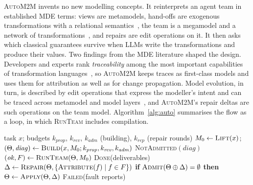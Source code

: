 \documentclass[pdflatex,sn-mathphys-num]{sn-jnl}
\theoremstyle{thmstyleone}%
\theoremstyle{thmstyletwo}%
\theoremstyle{thmstylethree}%
\newcommand{\auto}{\textsc{AutoM2M}}
\newcommand{\Team}{\Theta}
\begin{document}
\auto{} invents no new modelling concepts. It reinterprets an agent team in
established MDE terms: views are metamodels, hand-offs are exogenous
transformations with a relational semantics~\cite{omg2016qvt,stevens2010qvt},
the team is a megamodel and a network of transformations~\cite{stevens2020networks,klare2021vitruvius},
and repairs are edit operations on it. It then asks which classical guarantees
survive when LLMs write the transformations and produce their values. Two findings from the MDE literature shaped the design. Developers and
experts rank \emph{traceability} among the most important capabilities of
transformation languages~\cite{hoppner2024traceability,hoppner2022mtl}, so
\auto{} keeps traces as first-class models and uses them for attribution as
well as for change propagation. Model evolution, in turn, is described by edit
operations that express the modeller's intent and can be traced across
metamodel and model
layers~\cite{kehrer2011lifting,tinnes2025evolution,homolka2026coevolution}, and
\auto{}'s repair deltas are such operations on the team model.
Algorithm~\ref{alg:auto} summarises the flow as a loop, in which
\textsc{RunTeam} includes compilation.

\begin{algorithm}[t]
\caption{\auto{}: build, admit, run, attribute, repair}\label{alg:auto}
\begin{algorithmic}[1]
\Require task $x$; budgets $k_{\mathit{prop}}$, $k_{\mathit{rev}}$, $k_{\mathit{adm}}$ (building), $k_{\mathit{rep}}$ (repair rounds)
\State $M_0\gets\textsc{Lift}(x)$;\ \ $(\Team,\mathit{diag})\gets\textsc{Build}(x,M_0;k_{\mathit{prop}},k_{\mathit{rev}},k_{\mathit{adm}})$ 
 \Return \textsc{NotAdmitted}$(\mathit{diag})$ \EndIf
{}
  \State $(\mathit{ok},F)\gets\textsc{RunTeam}(\Team,M_0)$ 
   \Return \textsc{Done}(deliverables) \EndIf
    \State $\Delta\gets\textsc{Repair}(\Team,\{\textsc{Attribute}(f)\mid f\in F\})$ 
    \State \textbf{if} $\textsc{Admit}(\Team\oplus\Delta)=\emptyset$ \textbf{then} $\Team\gets\textsc{Apply}(\Team,\Delta)$ \Comment{F; else $\Team$ unchanged}
  \EndIf
\EndFor
\State \Return \textsc{Failed}(fault reports)
\end{algorithmic}
\end{algorithm}
\end{document}
